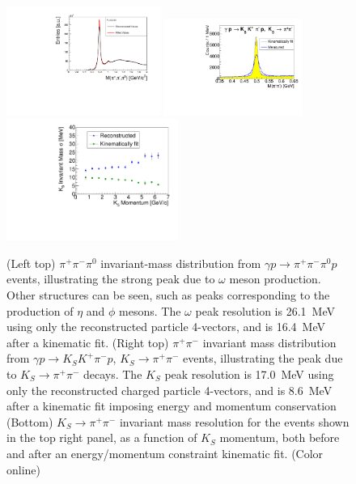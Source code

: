 \begin{figure}[tpb]
\begin{center}
\includegraphics[width=0.45\textwidth]{figures/omega_inv_mass_probCut_001.pdf}
\includegraphics[width=0.4\textwidth]{figures/kskpi_mass_spect.pdf}
\includegraphics[width=0.5\textwidth]{figures/kskpi_mass_resol.pdf}

\caption{\label{fig:invmass1}
(Left top) $\pi^+\pi^-\pi^0$ invariant-mass distribution from $\gamma p \to \pi^+\pi^-\pi^0 p$ events, illustrating the strong peak due to $\omega$ meson production.  Other structures can be seen, such as peaks corresponding to the production of $\eta$ and $\phi$ mesons.  The $\omega$ peak resolution is 26.1~MeV using only the reconstructed  particle 4-vectors, and is 16.4~MeV after a kinematic fit.
(Right top) $\pi^+\pi^-$ invariant mass distribution from $\gamma p \to K_S K^+ \pi^- p$, $K_S\to\pi^+\pi^-$ events, illustrating the peak due to $K_S\to\pi^+\pi^-$ decays.  The $K_S$ peak resolution is 17.0~MeV using only the reconstructed charged particle 4-vectors, and is 8.6~MeV after a kinematic fit imposing energy and momentum conservation
(Bottom) $K_S\to\pi^+\pi^-$ invariant mass resolution for the events shown in the top right panel, as a function of $K_S$ momentum, both before and after an energy/momentum constraint kinematic fit.
(Color online)}
\end{center}
\end{figure}

